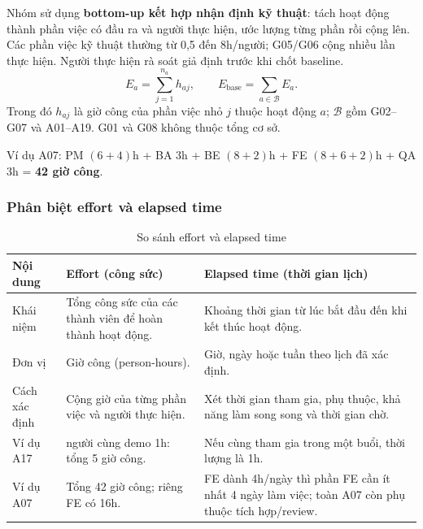 \documentclass{article}
\begin{document}
Nhóm sử dụng \textbf{bottom-up kết hợp nhận định kỹ thuật}: tách hoạt động thành phần việc có đầu ra và người thực hiện, ước lượng từng phần rồi cộng lên. Các phần việc kỹ thuật thường từ 0,5 đến 8h/người; G05/G06 cộng nhiều lần thực hiện. Người thực hiện rà soát giả định trước khi chốt baseline.
\[
E_{a}=\sum_{j=1}^{n_a}h_{aj},\qquad
E_{\mathrm{base}}=\sum_{a\in\mathcal B}E_a.
\]
Trong đó $h_{aj}$ là giờ công của phần việc nhỏ $j$ thuộc hoạt động $a$; $\mathcal B$ gồm G02--G07 và A01--A19. G01 và G08 không thuộc tổng cơ sở.

Ví dụ A07: PM $(6+4)$h + BA 3h + BE $(8+2)$h + FE $(8+6+2)$h + QA 3h = \textbf{42 giờ công}.

\subsubsection{Phân biệt effort và elapsed time}
\begin{table}[H]
\centering
\caption{So sánh effort và elapsed time}
\small
\renewcommand{\arraystretch}{1.2}
\begin{tabularx}{\textwidth}{|p{1.55cm}|>{\raggedright\arraybackslash}X|>{\raggedright\arraybackslash}X|}
\hline
\textbf{Nội dung} & \textbf{Effort (công sức)} & \textbf{Elapsed time (thời gian lịch)} \\ \hline
Khái niệm & Tổng công sức của các thành viên để hoàn thành hoạt động. & Khoảng thời gian từ lúc bắt đầu đến khi kết thúc hoạt động. \\ \hline
Đơn vị & Giờ công (person-hours). & Giờ, ngày hoặc tuần theo lịch đã xác định. \\ \hline
Cách xác định & Cộng giờ của từng phần việc và người thực hiện. & Xét thời gian tham gia, phụ thuộc, khả năng làm song song và thời gian chờ. \\ \hline
Ví dụ A17 & 5 người cùng demo 1h: tổng 5 giờ công. & Nếu cùng tham gia trong một buổi, thời lượng là 1h. \\ \hline
Ví dụ A07 & Tổng 42 giờ công; riêng FE có 16h. & FE dành 4h/ngày thì phần FE cần ít nhất 4 ngày làm việc; toàn A07 còn phụ thuộc tích hợp/review. \\ \hline
\end{tabularx}
\end{table}
\end{document}
